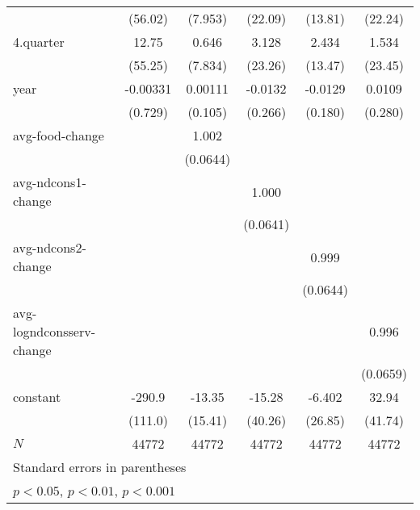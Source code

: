 \begin{table}[htbp]
\begin{tabular}{l*{5}{c}}
            &     (56.02)         &     (7.953)         &     (22.09)         &     (13.81)         &     (22.24)         \\
4.quarter   &       12.75         &       0.646         &       3.128         &       2.434         &       1.534         \\
            &     (55.25)         &     (7.834)         &     (23.26)         &     (13.47)         &     (23.45)         \\
year        &    -0.00331         &     0.00111         &     -0.0132         &     -0.0129         &      0.0109         \\
            &     (0.729)         &     (0.105)         &     (0.266)         &     (0.180)         &     (0.280)         \\
avg-food-change&                     &       1.002\sym{***}&                     &                     &                     \\
            &                     &    (0.0644)         &                     &                     &                     \\
avg-ndcons1-change&                     &                     &       1.000\sym{***}&                     &                     \\
            &                     &                     &    (0.0641)         &                     &                     \\
avg-ndcons2-change&                     &                     &                     &       0.999\sym{***}&                     \\
            &                     &                     &                     &    (0.0644)         &                     \\
avg-logndconsserv-change&                     &                     &                     &                     &       0.996\sym{***}\\
            &                     &                     &                     &                     &    (0.0659)         \\
constant    &      -290.9\sym{**} &      -13.35         &      -15.28         &      -6.402         &       32.94         \\
            &     (111.0)         &     (15.41)         &     (40.26)         &     (26.85)         &     (41.74)         \\
\hline
\(N\)       &       44772         &       44772         &       44772         &       44772         &       44772         \\
\hline\hline
\multicolumn{6}{l}{\footnotesize Standard errors in parentheses}\\
\multicolumn{6}{l}{\footnotesize \sym{*} \(p<0.05\), \sym{**} \(p<0.01\), \sym{***} \(p<0.001\)}\\
\end{tabular}
\end{table}
